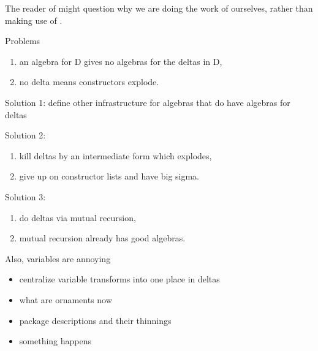 The reader of \cite{algorn} might question why we are doing the work of  ourselves, rather than making use of .
\begin{remark}
Problems
\begin{enumerate}
    \item an algebra for D gives no algebras for the deltas in D,
    \item no delta means constructors explode.
\end{enumerate}

Solution 1: define other infrastructure for algebras that do have algebras for deltas

Solution 2:
\begin{enumerate}
    \item kill deltas by an intermediate form which explodes,
    \item give up on constructor lists and have big sigma.
\end{enumerate}

Solution 3:
\begin{enumerate}
    \item do deltas via mutual recursion,
    \item mutual recursion already has good algebras.
\end{enumerate}

\end{remark} 

\begin{remark}
    Also, variables are annoying
    \begin{itemize}
        \item centralize variable transforms into one place in deltas
        \item what are ornaments now
    \end{itemize} 

    \begin{itemize}
        \item package descriptions and their thinnings
        \item something happens
    \end{itemize}
\end{remark}

